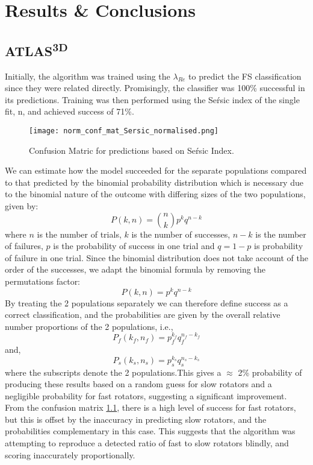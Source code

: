 \chapter{Results \& Conclusions}

\label{ch:results}

\section{ATLAS\textsuperscript{3D}}
Initially, the algorithm was trained using the $\lambda_{Re}$ to predict the FS classification since they were related directly. Promisingly, the classifier was 100\% successful in its predictions. Training was then performed using the Se\'rsic index of the single fit, n, and achieved success of 71\%.
\begin{figure}[h!]
	\centering
	\texttt{[image: norm\_conf\_mat\_Sersic\_normalised.png]}
	\caption{Confusion Matric for predictions based on Se\'rsic Index.
	}
	\label{fig:confmatDT}
\end{figure}
We can estimate how the model succeeded for the separate populations compared to that predicted by the binomial probability distribution which is necessary due to the binomial nature of the outcome with differing sizes of the two populations, given by\cite{simmons_2016}:
\begin{equation}
P(k,n) = \binom{n}{k}p^{k}q^{n-k}
\end{equation}
where $n$ is the number of trials, $k$ is the number of successes, $n-k$ is the number of failures, $p$ is the probability of success in one trial and $q=1-p$ is probability of failure in one trial. Since the binomial distribution does not take account of the order of the successes, we adapt the binomial formula by removing the permutations factor:
\begin{equation}
P(k,n) = p^{k}q^{n-k}
\end{equation}
By treating the 2 populations separately we can therefore define success as a correct classification, and the probabilities are given by the overall relative number proportions of the 2 populations, i.e.,
\begin{equation}
P_{f}(k_{f},n_{f}) = p_{f}^{k_{f}}q_{f}^{n_{f}-k_{f}}
\end{equation}
and,
\begin{equation}
P_{s}(k_{s},n_{s}) = p_{s}^{k_{s}}q_{s}^{n_{s}-k_{s}}
\end{equation}
where the subscripts denote the 2 populations.This gives a $\approx$ 2\% probability of producing these results based on a random guess for slow rotators and a negligible probability for fast rotators, suggesting a significant improvement. From the confusion matrix \ref{fig:confmatDT}, there is a high level of success for fast rotators, but this is offset by the inaccuracy in predicting slow rotators, and the probabilities complementary in this case. This suggests that the algorithm was attempting to reproduce a detected ratio of fast to slow rotators blindly, and scoring inaccurately proportionally. \\

